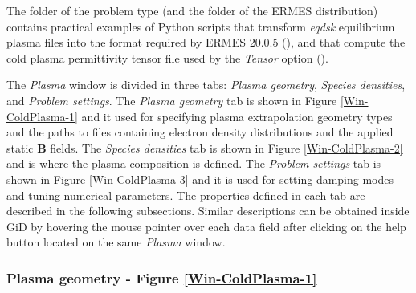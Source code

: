 The folder  of the problem type (and the folder  of the ERMES distribution) contains practical examples of Python scripts that transform \textit{eqdsk} equilibrium plasma files into the format required by ERMES 20.0.5 (), and that compute the cold plasma permittivity tensor file  used by the \textit{Tensor} option ().

The \textit{Plasma} window is divided in three tabs: \textit{Plasma geometry}, \textit{Species densities}, and \textit{Problem settings}. The \textit{Plasma geometry} tab is shown in Figure \ref{Win-ColdPlasma-1} and it used for specifying plasma extrapolation geometry types and the paths to files containing electron density distributions and the applied static \textbf{B} fields. The \textit{Species densities} tab is shown in Figure \ref{Win-ColdPlasma-2} and is where the plasma composition is defined. The \textit{Problem settings} tab is shown in Figure \ref{Win-ColdPlasma-3} and it is used for setting damping modes and tuning numerical parameters. The properties defined in each tab are described in the following subsections. Similar descriptions can be obtained inside GiD by hovering the mouse pointer over each data field after clicking on the help button located on the same \textit{Plasma} window.

\subsubsection{Plasma geometry - Figure \ref{Win-ColdPlasma-1}}\label{PlasmaGeometrySettings}

